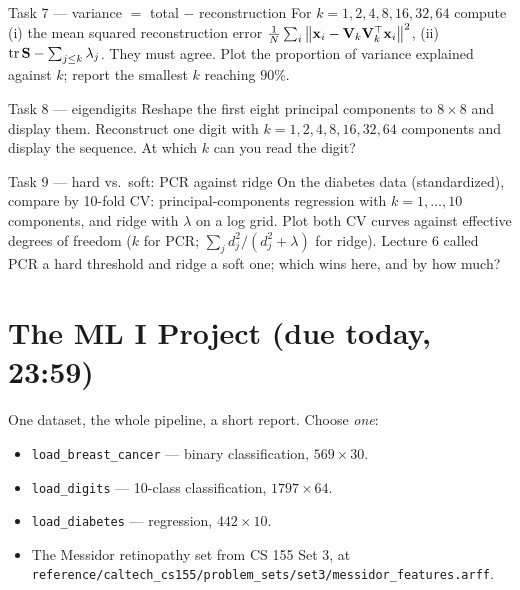 \documentclass[11pt]{article}
\begin{document}
\begin{task}{Task 7 --- variance $=$ total $-$ reconstruction}
For $k=1,2,4,8,16,32,64$ compute (i) the mean squared reconstruction error $\frac1N\sum_i\left\lVert \mathbf{x}_i-\mathbf{V}_k\mathbf{V}_k^{\top}\mathbf{x}_i \right\rVert^2$,
(ii) $\operatorname{tr}\mathbf{S}-\sum_{j\le k}\lambda_j$. They must agree. Plot the proportion of variance explained against $k$;
report the smallest $k$ reaching $90\%$.
\end{task}

\begin{task}{Task 8 --- eigendigits}
Reshape the first eight principal components to $8\times8$ and display them. Reconstruct one digit with
$k=1,2,4,8,16,32,64$ components and display the sequence. At which $k$ can you read the digit?
\end{task}

\begin{task}{Task 9 --- hard vs.\ soft: PCR against ridge}
On the diabetes data (standardized), compare by 10-fold CV:
principal-components regression with $k=1,\dots,10$ components, and ridge with $\lambda$ on a log grid.
Plot both CV curves against effective degrees of freedom ($k$ for PCR; $\sum_jd_j^2/(d_j^2+\lambda)$ for ridge).
Lecture 6 called PCR a hard threshold and ridge a soft one; which wins here, and by how much?
\end{task}

\section{The ML I Project (due today, 23:59)}

One dataset, the whole pipeline, a short report. Choose \emph{one}:
\begin{itemize}[nosep]
  \item \texttt{load\_breast\_cancer} --- binary classification, $569\times30$.
  \item \texttt{load\_digits} --- 10-class classification, $1797\times64$.
  \item \texttt{load\_diabetes} --- regression, $442\times10$.
  \item The Messidor retinopathy set from CS 155 Set 3, at\\ \texttt{reference/caltech\_cs155/problem\_sets/set3/messidor\_features.arff}.
\end{itemize}
\end{document}
